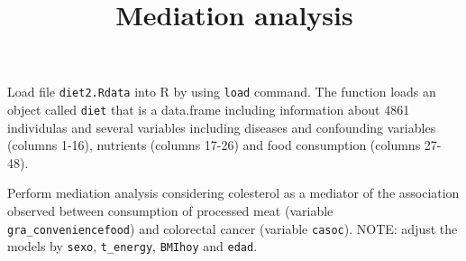 \documentclass[11pt]{article}
\begin{document}
\title{\bf Mediation analysis}
\date{}


\maketitle




 Load file {\tt diet2.Rdata} into R by using {\tt load} command. The function loads an object called {\tt diet} that is a data.frame including information about 4861 individulas and several variables including diseases and confounding variables (columns 1-16), nutrients (columns 17-26) and food consumption (columns 27-48). 

\bigskip

\noindent Perform mediation analysis considering colesterol as a mediator of the association observed between consumption of processed meat (variable {\tt gra\_conveniencefood}) and colorectal cancer (variable {\tt casoc}). NOTE: adjust the models by {\tt sexo}, {\tt t\_energy}, {\tt BMIhoy} and {\tt edad}.
\end{document}
